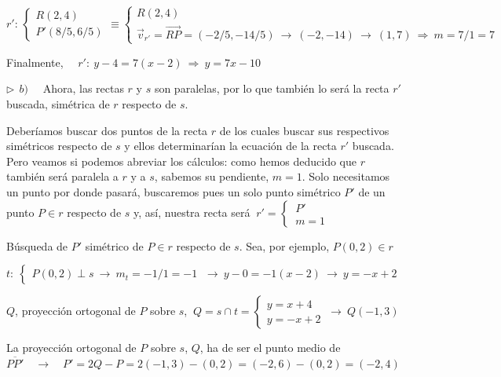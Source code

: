 \begin{miejercicio}
\vspace{2mm} $r':\,\begin{cases} R(2,4) \\ P'(8/5,6/5) \end{cases} \equiv \begin{cases} R(2,4) \\ \vec v_{r'}=\overrightarrow{RP}=(-2/5,-14/5) \ \to \ (-2,-14) \ \to \ (1,7) \ \Rightarrow \ m=7/1=7 \end{cases}$

\vspace{2mm} Finalmente, $\quad r':\ y-4=7(x-2) \ \Rightarrow \ y=7x-10$ 

\vspace{6mm} $\triangleright \ \ b)\quad $ Ahora, las rectas $r$ y $s$ son paralelas, por lo que también lo será la recta $r'$ buscada, simétrica de $r$ respecto de $s$.

\vspace{2mm} Deberíamos buscar dos puntos de la recta $r$ de los cuales buscar sus respectivos simétricos respecto de $s$ y ellos determinarían la ecuación de la recta $r'$ buscada. Pero veamos si podemos abreviar los cálculos: como hemos deducido que $r$ también será paralela a $r$ y a $s$, sabemos su pendiente, $m=1$. Solo necesitamos un punto por donde pasará, buscaremos pues un solo punto simétrico $P'$ de un punto $P\in r$ respecto de $s$ y, así, nuestra recta será $\ r'=\begin{cases} \, P' \\ \, m=1 \end{cases}$

\vspace{2mm}   Búsqueda de $P'$ simétrico de $P\in r$ respecto de $s$. Sea, por ejemplo, $P(0,2)\in r$

\vspace{2mm} $t:\ \begin{cases} P(0,2) \perp s \ \to \ m_t=-1/1=-1 \end{cases} \ \to \ y-0 =-1(x-2)  \ \to \ y=-x+2$

\vspace{2mm} $Q$, proyección ortogonal de $P$ sobre $s$, $\ Q=s\cap t = \begin{cases} y=x+4 \\ y=-x+2 \end{cases} \ \to \ Q(-1,3)$

\vspace{2mm} La proyección ortogonal de $P$ sobre $s$, $Q$, ha de ser el punto medio de $\overline{PP'} \quad  \to \quad P'=2Q-P=2(-1,3)-(0,2)=(-2,6)-(0,2)=(-2,4)$


\end{miejercicio}
